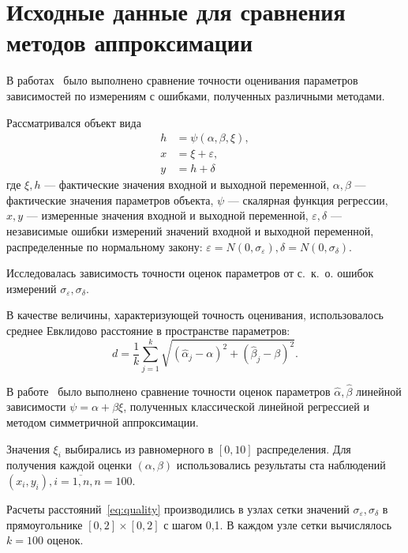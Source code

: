 \chapter{Исходные данные для сравнения методов аппроксимации}

В работах~\cite{budny17,budny15} было выполнено сравнение точности оценивания параметров
зависимостей по измерениям с ошибками, полученных различными методами.

Рассматривался объект вида
\begin{equation}
  \label{eq:model}
  \begin{aligned}
  h &= \psi (\alpha, \beta, \xi), \\
  x &= \xi + \varepsilon, \\
  y &= h + \delta
  \end{aligned}
\end{equation}
где
\( \xi, h \) --- фактические значения входной и выходной переменной,
\( \alpha, \beta \) --- фактические значения параметров объекта,
\( \psi \) --- скалярная функция регрессии,
\( x, y \) --- измеренные значения входной и выходной переменной,
\( \varepsilon, \delta \) --- независимые ошибки измерений значений входной и выходной переменной,
распределенные по нормальному закону:
\( \varepsilon = N(0, \sigma_{\varepsilon}), \delta = N(0, \sigma_{\delta}) \).

Исследовалась зависимость точности оценок параметров от с.~к.~о.
ошибок измерений \( \sigma_{\varepsilon}, \sigma_{\delta} \).

В качестве величины, характеризующей точность оценивания,
использовалось среднее Евклидово расстояние в пространстве параметров:
\begin{equation}
  \label{eq:quality}
  d = \frac{1}{k} \sum_{j=1}^k \sqrt{(\hat{\alpha}_j - \alpha)^2 + (\hat{\beta}_j - \beta)^2}.
\end{equation}

В работе~\cite{budny17} было выполнено сравнение точности оценок параметров
\( \hat{\alpha}, \hat{\beta} \) линейной зависимости \( \psi = \alpha + \beta \xi \),
полученных классической линейной регрессией и методом симметричной аппроксимации.

Значения \( \xi_i \) выбирались из равномерного в \( [0, 10] \) распределения.
Для получения каждой оценки \( ( \alpha, \beta ) \) использовались результаты
ста наблюдений \( ( x_i, y_i ), i = \overline{1, n}, n = 100 \).

Расчеты расстояний~\eqref{eq:quality} производились в узлах сетки значений
\( \sigma_{\varepsilon}, \sigma_{\delta} \) в прямоугольнике
\( [0, 2] \times [0, 2] \) с шагом 0{,}1.
В каждом узле сетки вычислялось \( k = 100 \) оценок.

